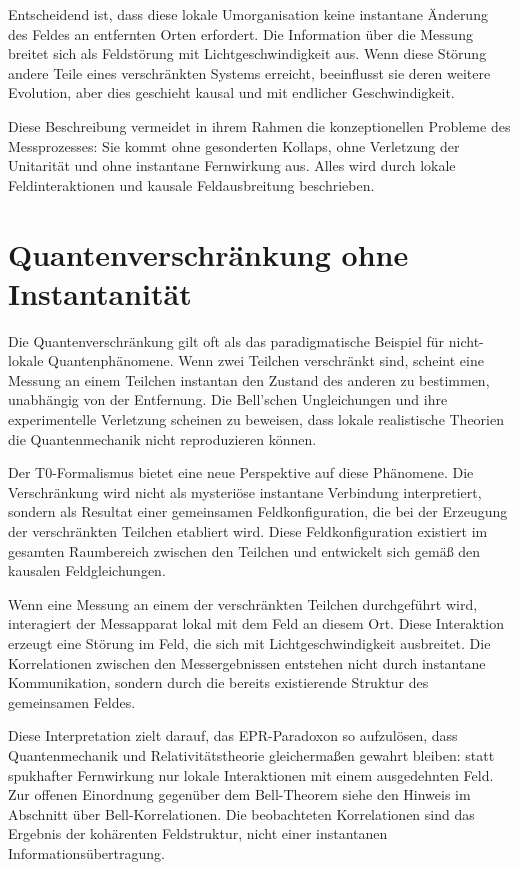 	Entscheidend ist, dass diese lokale Umorganisation keine instantane Änderung des Feldes an entfernten Orten erfordert. Die Information über die Messung breitet sich als Feldstörung mit Lichtgeschwindigkeit aus. Wenn diese Störung andere Teile eines verschränkten Systems erreicht, beeinflusst sie deren weitere Evolution, aber dies geschieht kausal und mit endlicher Geschwindigkeit.
	
	Diese Beschreibung vermeidet in ihrem Rahmen die konzeptionellen Probleme des Messprozesses: Sie kommt ohne gesonderten Kollaps, ohne Verletzung der Unitarität und ohne instantane Fernwirkung aus. Alles wird durch lokale Feldinteraktionen und kausale Feldausbreitung beschrieben.
	
	\section{Quantenverschränkung ohne Instantanität}
	
	Die Quantenverschränkung gilt oft als das paradigmatische Beispiel für nicht-lokale Quantenphänomene. Wenn zwei Teilchen verschränkt sind, scheint eine Messung an einem Teilchen instantan den Zustand des anderen zu bestimmen, unabhängig von der Entfernung. Die Bell'schen Ungleichungen und ihre experimentelle Verletzung scheinen zu beweisen, dass lokale realistische Theorien die Quantenmechanik nicht reproduzieren können.
	
	Der T0-Formalismus bietet eine neue Perspektive auf diese Phänomene. Die Verschränkung wird nicht als mysteriöse instantane Verbindung interpretiert, sondern als Resultat einer gemeinsamen Feldkonfiguration, die bei der Erzeugung der verschränkten Teilchen etabliert wird. Diese Feldkonfiguration existiert im gesamten Raumbereich zwischen den Teilchen und entwickelt sich gemäß den kausalen Feldgleichungen.
	
	Wenn eine Messung an einem der verschränkten Teilchen durchgeführt wird, interagiert der Messapparat lokal mit dem Feld an diesem Ort. Diese Interaktion erzeugt eine Störung im Feld, die sich mit Lichtgeschwindigkeit ausbreitet. Die Korrelationen zwischen den Messergebnissen entstehen nicht durch instantane Kommunikation, sondern durch die bereits existierende Struktur des gemeinsamen Feldes.
	
	Diese Interpretation zielt darauf, das EPR-Paradoxon so aufzulösen, dass Quantenmechanik und Relativitätstheorie gleichermaßen gewahrt bleiben: statt spukhafter Fernwirkung nur lokale Interaktionen mit einem ausgedehnten Feld. Zur offenen Einordnung gegenüber dem Bell-Theorem siehe den Hinweis im Abschnitt über Bell-Korrelationen. Die beobachteten Korrelationen sind das Ergebnis der kohärenten Feldstruktur, nicht einer instantanen Informationsübertragung.
